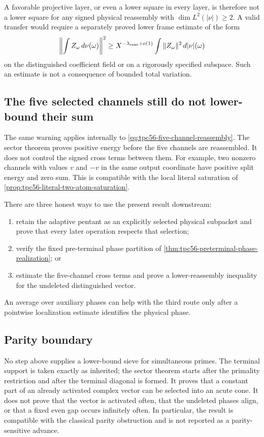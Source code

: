A favorable projective layer, or even a lower square in every layer, is
therefore not a lower square for any signed physical reassembly with
\(\dim L^2(|\nu|)\ge2\).  A valid
transfer would require a separately proved lower frame estimate of the
form
\begin{equation}
 \left\|\int Z_\omega\,d\nu(\omega)\right\|^2
 \ge X^{-\lambda_{\rm reas}+o(1)}
 \int\|Z_\omega\|^2\,d|\nu|(\omega)
 \label{eq:tpc56-required-lower-reassembly}
\end{equation}
on the distinguished coefficient field or on a rigorously specified
subspace.  Such an estimate is not a consequence of bounded total
variation.

\subsection{The five selected channels still do not lower-bound their sum}

The same warning applies internally to
\eqref{eq:tpc56-five-channel-reassembly}.  The sector theorem proves
positive energy before the five channels are reassembled.  It does not
control the signed cross terms between them.  For example, two nonzero
channels with values \(v\) and \(-v\) in the same output coordinate have
positive split energy and zero sum.  This is compatible with the local
literal saturation of \cref{prop:tpc56-literal-two-atom-saturation}.

There are three honest ways to use the present result downstream:
\begin{enumerate}[label=\textup{(\roman*)},leftmargin=2.8em]
 \item retain the adaptive pentant as an explicitly selected physical
       subpacket and prove that every later operation respects that
       selection;
 \item verify the fixed pre-terminal phase partition of
       \cref{thm:tpc56-preterminal-phase-realization}; or
 \item estimate the five-channel cross terms and prove a lower-reassembly
       inequality for the undeleted distinguished vector.
\end{enumerate}
An average over auxiliary phases can help with the third route only after
a pointwise localization estimate identifies the physical phase.

\subsection{Parity boundary}

No step above supplies a lower-bound sieve for simultaneous primes.  The
terminal support is taken exactly as inherited; the sector theorem starts
after the primality restriction and after the terminal diagonal is formed.
It proves that a constant part of an already activated complex vector can
be selected into an acute cone.  It does not prove that the vector is
activated often, that the undeleted phases align, or that a fixed even gap
occurs infinitely often.  In particular, the result is compatible with the
classical parity obstruction \citep{FriedlanderIwaniec2010} and is not
reported as a parity-sensitive advance.
